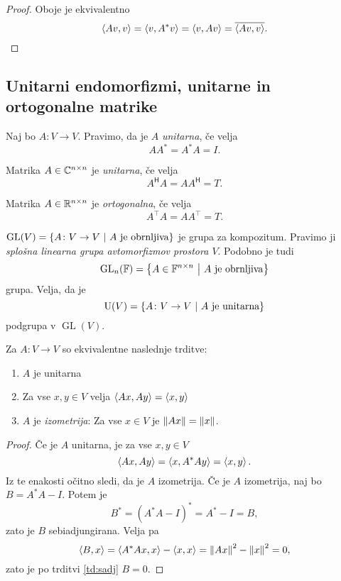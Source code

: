 \documentclass[12pt, a4paper]{article}
\begin{document}
\begin{proof}
Oboje je ekvivalentno
\[
\left\langle Av,v\right\rangle=\left\langle v,A^*v\right\rangle=\left\langle v,Av\right\rangle=\overline{\left\langle Av,v\right\rangle}.\qedhere
\]
\end{proof}

\newpage

\subsection{Unitarni endomorfizmi, unitarne in ortogonalne matrike}

\begin{definicija}
Naj bo $A\colon V\to V$. Pravimo, da je $A$ \emph{unitarna}, če velja
\[
AA^*=A^*A=I.
\]
\end{definicija}

\begin{definicija}
Matrika $A\in\mathbb{C}^{n\times n}$ je \emph{unitarna}, če velja
\[
A^\mathsf{H}A=AA^\mathsf{H}=T.
\]
\end{definicija}

\begin{definicija}
Matrika $A\in\mathbb{R}^{n\times n}$ je \emph{ortogonalna}, če velja
\[
A^\top A=AA^\top=T.
\]
\end{definicija}

\begin{opomba}
$\operatorname{GL}(V)=\left\{A\colon V\to V~\middle\vert~\text{$A$ je obrnljiva}\right\}$ je grupa za kompozitum. Pravimo ji \emph{splošna linearna grupa avtomorfizmov prostora $V$}. Podobno je tudi
\[
\operatorname{GL}_n(\mathbb{F})=\left\{A\in\mathbb{F}^{n\times n}~\middle\vert~\text{$A$ je obrnljiva}\right\}
\]
grupa. Velja, da je
\[
\operatorname{U}(V)=\left\{A\colon V\to V~\middle\vert~\text{$A$ je unitarna}\right\}
\]
podgrupa v $\operatorname{GL}(V)$.
\end{opomba}

\begin{trditev}
Za $A\colon V\to V$ so ekvivalentne naslednje trditve:

\begin{enumerate}
\item $A$ je unitarna
\item Za vse $x,y\in V$ velja $\left\langle Ax,Ay\right\rangle=\left\langle x,y\right\rangle$
\item $A$ je \emph{izometrija}: Za vse $x\in V$ je $\left\lVert Ax\right\rVert=\left\lVert x\right\rVert$.
\end{enumerate}
\end{trditev}

\begin{proof}
Če je $A$ unitarna, je za vse $x,y\in V$
\[
\left\langle Ax,Ay\right\rangle=\left\langle x,A^*Ay\right\rangle=\left\langle x,y\right\rangle.
\]
Iz te enakosti očitno sledi, da je $A$ izometrija. Če je $A$ izometrija, naj bo $B=A^*A-I$. Potem je
\[
B^*=(A^*A-I)^*=A^*-I=B,
\]
zato je $B$ sebiadjungirana. Velja pa
\[
\left\langle B,x\right\rangle=\left\langle A^*Ax,x\right\rangle-\left\langle x,x\right\rangle=\left\lVert Ax\right\rVert^2-\left\lVert x\right\rVert^2=0,
\]
zato je po trditvi \ref{td:sadj} $B=0$.
\end{proof}
\end{document}
